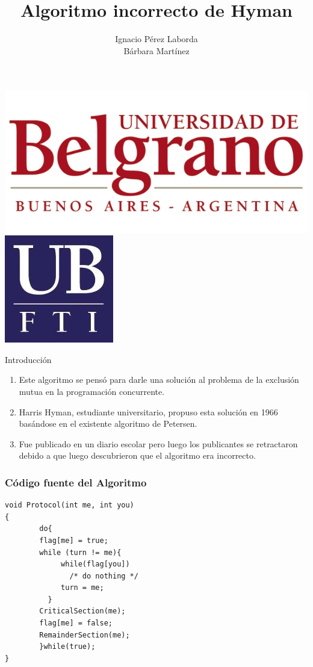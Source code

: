 \documentclass{beamer}
\title[Tecnologia]
{Algoritmo incorrecto de Hyman}
\subtitle{}
\author[Grupo 3] 
{Ignacio P\'erez Laborda\\B\'arbara Mart\'inez}
\institute[UB--FTI] 
{
  Facultad de Tecnolog\'ia Inform\'atica\\
  Universidad de Belgrano
}
\date[\today]
\begin{document}

\begin{frame}

\includegraphics[height=0.2\textheight]{ub2.jpg} \hspace*{6cm}
\includegraphics[height=0.19\textheight]{FTI.jpg}  
\\[-0.1cm]
\titlepage


\end{frame}

\begin{frame}{Introducción}
\begin{enumerate}
\item Este algoritmo se pensó para darle una solución al problema de la exclusión mutua en la 
programación concurrente.
\item Harris Hyman, estudiante universitario, propuso esta solución en 1966 basándose en el 
existente algoritmo de Petersen.
\item Fue publicado en un diario escolar pero luego los publicantes se retractaron debido a que 
luego descubrieron que el algoritmo era incorrecto.
\end{enumerate}

\end{frame}

\begin{frame}[fragile]

\frametitle{Código fuente del Algoritmo}

\begin{lstlisting}[frame=single]
void Protocol(int me, int you)
{
        do{
        flag[me] = true;
        while (turn != me){
             while(flag[you])
               /* do nothing */
             turn = me;
          }
        CriticalSection(me);
        flag[me] = false;
        RemainderSection(me);
        }while(true);
}
\end{lstlisting}
\end{frame}
\end{document}
